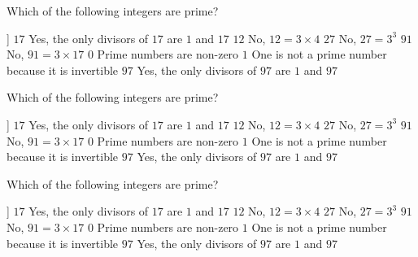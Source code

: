 \documentclass[theme=dark]{webquiz}
\begin{document}
  \begin{question}     %
     Which of the following integers are prime?
     \begin{choice}[multiple, columns=3]]
       \correct   $17$ \response Yes, the only divisors of $17$ are $1$ and $17$
       \incorrect $12$ \response No, $12 = 3\times 4$
       \incorrect $27$ \response No, $27=3^3$
       \incorrect $91$ \response No, $91 = 3\times 17$
       \incorrect  $0$ \response Prime numbers are non-zero
       \incorrect  $1$ \response One is not a prime number because it is invertible
       \correct   $97$ \response Yes, the only divisors of $97$ are $1$ and $97$
     \end{choice}
  \end{question}

  \begin{question}     %
     Which of the following integers are prime?
     \begin{choice}[multiple, columns=3]]
       \correct   $17$ \response Yes, the only divisors of $17$ are $1$ and $17$
       \incorrect $12$ \response No, $12 = 3\times 4$
       \incorrect $27$ \response No, $27=3^3$
       \incorrect $91$ \response No, $91 = 3\times 17$
       \incorrect  $0$ \response Prime numbers are non-zero
       \incorrect  $1$ \response One is not a prime number because it is invertible
       \correct   $97$ \response Yes, the only divisors of $97$ are $1$ and $97$
     \end{choice}
  \end{question}

  \begin{question}     %
     Which of the following integers are prime?
     \begin{choice}[multiple, columns=3]]
       \correct   $17$ \response Yes, the only divisors of $17$ are $1$ and $17$
       \incorrect $12$ \response No, $12 = 3\times 4$
       \incorrect $27$ \response No, $27=3^3$
       \incorrect $91$ \response No, $91 = 3\times 17$
       \incorrect  $0$ \response Prime numbers are non-zero
       \incorrect  $1$ \response One is not a prime number because it is invertible
       \correct   $97$ \response Yes, the only divisors of $97$ are $1$ and $97$
     \end{choice}
  \end{question}
\end{document}
